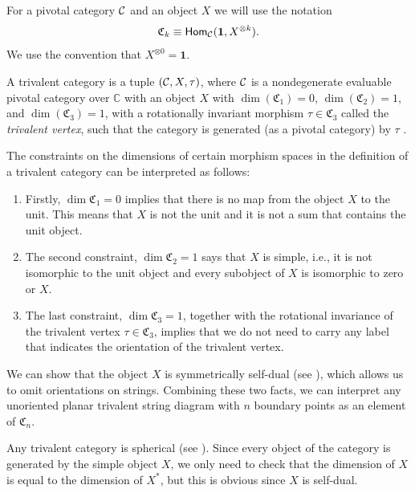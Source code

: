 	\begin{rem}
		For a pivotal category ${\mathcal{C}}$ and an object $X$ we will use the notation
			\begin{equation}
				\mathfrak{C}_k\equiv\mathsf{Hom}_{\mathcal{C}}(\mathbf{1},X^{\otimes k}).
			\end{equation}
		We use the convention that $X^{\otimes 0}=\mathbf{1}$.
	\end{rem}
	
	\begin{defn}
		A trivalent category is a tuple $({\mathcal{C}},X,\tau)$, where ${\mathcal{C}}$ is a nondegenerate evaluable pivotal category over $\mathbb{C}$ with an object $X$ with $\dim(\mathfrak{C}_1) = 0$, $\dim(\mathfrak{C}_2) = 1$, and $\dim(\mathfrak{C}_3) = 1$, with a rotationally invariant morphism $\tau\in\mathfrak{C}_3$ called the \emph{trivalent vertex}, such that the category is generated (as a pivotal category) by $\tau$ .
	\end{defn}

	The constraints on the dimensions of certain morphism spaces in the definition of a trivalent category can be interpreted as follows: 
		\begin{enumerate}
			\item Firstly, $\dim\mathfrak{C}_1=0$ implies that there is no map from the object $X$ to the unit. This means that $X$ is not the unit and it is not a sum that contains the unit object.
			\item The second constraint, $\dim\mathfrak{C}_2=1$ says that $X$ is simple, i.e., it is not isomorphic to the unit object and every subobject of $X$ is isomorphic to zero or $X$.
			\item The last constraint, $\dim\mathfrak{C}_3=1$, together with the rotational invariance of the trivalent vertex $\tau\in\mathfrak{C}_3$, implies that we do not need to carry any label that indicates the orientation of the trivalent vertex.
		\end{enumerate}
	
	\begin{rem}
		We can show that the object $X$ is symmetrically self-dual (see \cite[Lemma 2.2]{Morrison2017}), which allows us to omit orientations on strings. Combining these two facts, we can interpret any unoriented planar trivalent string diagram with $n$ boundary points as an element of $\mathfrak{C}_n$.
	\end{rem}

	\begin{rem}
		Any trivalent category is spherical (see \cite[Rem.\ 2.5]{Morrison2017}). Since every object of the category is generated by the simple object $X$, we only need to check that the dimension of $X$ is equal to the dimension of $X^*$, but this is obvious since $X$ is self-dual.
	\end{rem}

